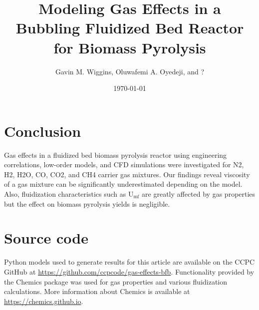 \documentclass{article}
\title{Modeling Gas Effects in a Bubbling Fluidized Bed Reactor for Biomass Pyrolysis}
\author{Gavin M. Wiggins, Oluwafemi A. Oyedeji, and ?}
\date{\today}
\begin{document}
\maketitle
\tableofcontents








\section{Conclusion}

Gas effects in a fluidized bed biomass pyrolysis reactor using engineering correlations, low-order models, and CFD simulations were investigated for N2, H2, H2O, CO, CO2, and CH4 carrier gas mixtures. Our findings reveal viscosity of a gas mixture can be significantly underestimated depending on the model. Also, fluidization characteristics such as U$_\text{mf}$ are greatly affected by gas properties but the effect on biomass pyrolysis yields is negligible.

\section{Source code}

Python models used to generate results for this article are available on the CCPC GitHub at \url{https://github.com/ccpcode/gas-effects-bfb}. Functionality provided by the Chemics package was used for gas properties and various fluidization calculations. More information about Chemics is available at \url{https://chemics.github.io}.

\printbibliography
\end{document}
